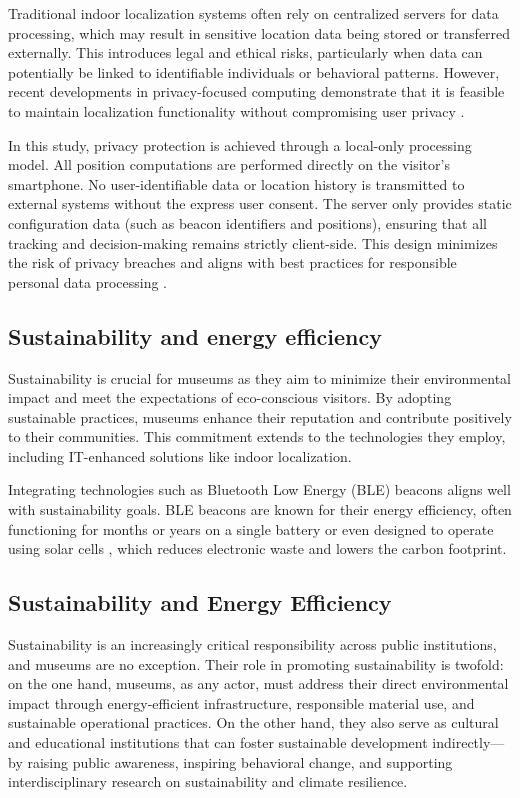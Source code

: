 Traditional indoor localization systems often rely on centralized servers for data processing, which may result in sensitive location data being stored or transferred externally. This introduces legal and ethical risks, particularly when data can potentially be linked to identifiable individuals or behavioral patterns. However, recent developments in privacy-focused computing demonstrate that it is feasible to maintain localization functionality without compromising user privacy \cite{alletto_indoor_2016, spachos_ble_2020}.

In this study, privacy protection is achieved through a local-only processing model. All position computations are performed directly on the visitor’s smartphone. No user-identifiable data or location history is transmitted to external systems without the express user consent. The server only provides static configuration data (such as beacon identifiers and positions), ensuring that all tracking and decision-making remains strictly client-side. This design minimizes the risk of privacy breaches and aligns with best practices for responsible personal data processing \cite{cnil-recomendation-mobile}.

\subsection{Sustainability and energy efficiency}

Sustainability is crucial for museums as they aim to minimize their environmental impact and meet the expectations of eco-conscious visitors. By adopting sustainable practices, museums enhance their reputation and contribute positively to their communities. This commitment extends to the technologies they employ, including IT-enhanced solutions like indoor localization. 

Integrating technologies such as Bluetooth Low Energy (BLE) beacons aligns well with sustainability goals. BLE beacons are known for their energy efficiency, often functioning for months or years on a single battery or even designed to operate using solar cells \cite{spachos_ble_2020}, which reduces electronic waste and lowers the carbon footprint.

\subsection{Sustainability and Energy Efficiency}

Sustainability is an increasingly critical responsibility across public institutions, and museums are no exception. Their role in promoting sustainability is twofold: on the one hand, museums, as any actor, must address their direct environmental impact through energy-efficient infrastructure, responsible material use, and sustainable operational practices. On the other hand, they also serve as cultural and educational institutions that can foster sustainable development indirectly—by raising public awareness, inspiring behavioral change, and supporting interdisciplinary research on sustainability and climate resilience.


